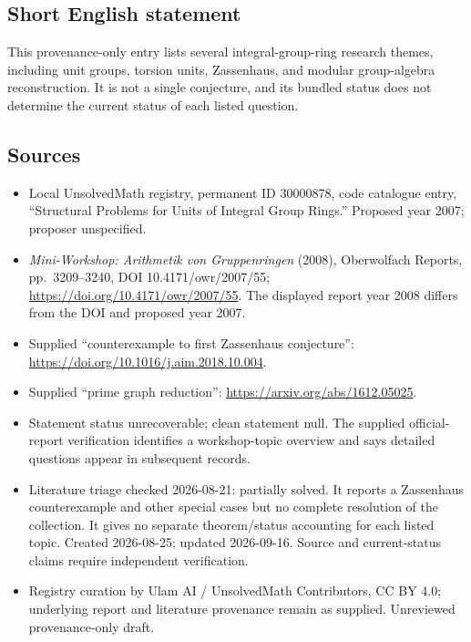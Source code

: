 \documentclass[11pt]{article}
\begin{document}
\subsection{Short English statement}
This provenance-only entry lists several integral-group-ring research themes, including unit groups, torsion units, Zassenhaus, and modular group-algebra reconstruction. It is not a single conjecture, and its bundled status does not determine the current status of each listed question.
\subsection{Sources}
\begin{itemize}
\item Local UnsolvedMath registry, permanent ID 30000878, code catalogue entry, ``Structural Problems for Units of Integral Group Rings.'' Proposed year 2007; proposer unspecified.
\item \emph{Mini-Workshop: Arithmetik von Gruppenringen} (2008), Oberwolfach Reports, pp.\ 3209--3240, DOI 10.4171/owr/2007/55; \url{https://doi.org/10.4171/owr/2007/55}. The displayed report year 2008 differs from the DOI and proposed year 2007.
\item Supplied ``counterexample to first Zassenhaus conjecture'': \url{https://doi.org/10.1016/j.aim.2018.10.004}.
\item Supplied ``prime graph reduction'': \url{https://arxiv.org/abs/1612.05025}.
\item Statement status unrecoverable; clean statement null. The supplied official-report verification identifies a workshop-topic overview and says detailed questions appear in subsequent records.
\item Literature triage checked 2026-08-21: partially solved. It reports a Zassenhaus counterexample and other special cases but no complete resolution of the collection. It gives no separate theorem/status accounting for each listed topic. Created 2026-08-25; updated 2026-09-16. Source and current-status claims require independent verification.
\item Registry curation by Ulam AI / UnsolvedMath Contributors, CC BY 4.0; underlying report and literature provenance remain as supplied. Unreviewed provenance-only draft.
\end{itemize}
\end{document}
